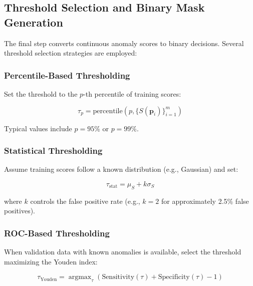 \documentclass[12pt]{article}
\DeclareMathOperator{\argmax}{argmax}
\newcommand{\patch}{\mathbf{p}}
\begin{document}
\subsection{Threshold Selection and Binary Mask Generation}
\label{subsec:thresholding}

The final step converts continuous anomaly scores to binary decisions. Several threshold selection strategies are employed:

\subsubsection{Percentile-Based Thresholding}
\label{subsubsec:percentile_threshold}

Set the threshold to the $p$-th percentile of training scores:

\begin{equation}
    \label{eq:percentile_threshold}
    \tau_p = \text{percentile}(p, \{S(\patch_i)\}_{i=1}^m)
\end{equation}

Typical values include $p = 95\%$ or $p = 99\%$.

\subsubsection{Statistical Thresholding}
\label{subsubsec:statistical_threshold}

Assume training scores follow a known distribution (e.g., Gaussian) and set:

\begin{equation}
    \label{eq:statistical_threshold}
    \tau_{\text{stat}} = \mu_S + k \sigma_S
\end{equation}

where $k$ controls the false positive rate (e.g., $k = 2$ for approximately 2.5\% false positives).

\subsubsection{ROC-Based Thresholding}
\label{subsubsec:roc_threshold}

When validation data with known anomalies is available, select the threshold maximizing the Youden index:

\begin{equation}
    \label{eq:youden_threshold}
    \tau_{\text{Youden}} = \argmax_{\tau} (\text{Sensitivity}(\tau) + \text{Specificity}(\tau) - 1)
\end{equation}
\end{document}

